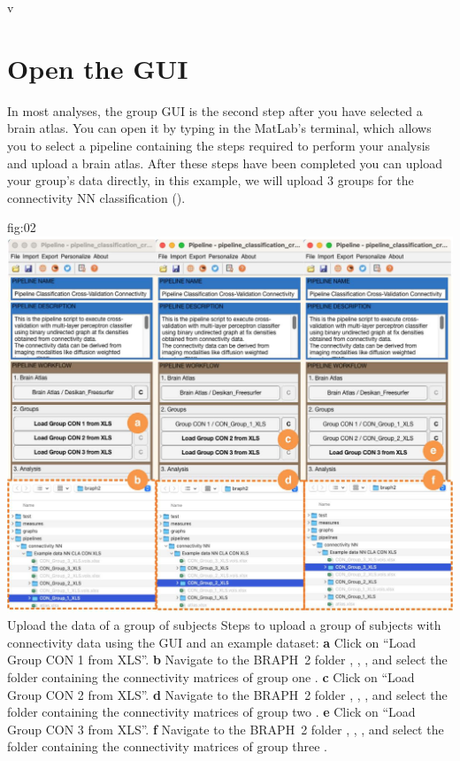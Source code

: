v\documentclass[justified]{tufte-handout}
\begin{document}
\section{Open the GUI}

In most analyses, the group GUI is the second step after you have selected a brain atlas. You can open it by typing  in the MatLab's terminal, which allows you to select a pipeline containing the steps required to perform your analysis and upload a brain atlas. After these steps have been completed you can upload your group's data directly, in this example, we will upload 3 groups for the connectivity NN classification (). 

	{fig:02}
	{
	\includegraphics{fig02.jpg}
	}
	{Upload the data of a group of subjects}
	{
	Steps to upload a group of subjects with connectivity data using the GUI and an example dataset: 
	{\bf a} Click on ``Load Group CON 1 from XLS''.
	{\bf b} Navigate to the BRAPH~2 folder , , , and select the folder containing the connectivity matrices of group one .
        {\bf c} Click on ``Load Group CON 2 from XLS''.
	{\bf d} Navigate to the BRAPH~2 folder , , , and select the folder containing the connectivity matrices of group two .
        {\bf e} Click on ``Load Group CON 3 from XLS''.
        {\bf f} Navigate to the BRAPH~2 folder , , , and select the folder containing the connectivity matrices of group three .
	}
\end{document}
